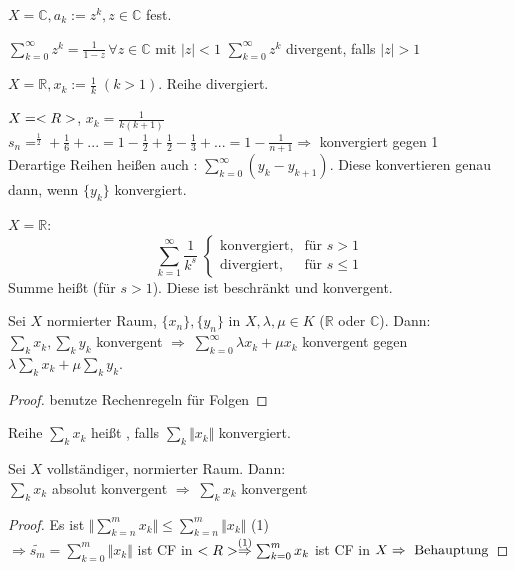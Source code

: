 \begin{example}
	 $X=\mathbb{C}, a_k:= z^k, z\in\mathbb{C}$ fest.
	
	$\sum_{k=0}^\infty z^k = \frac{1}{1-z}\,\forall z\in\mathbb{C}$ mit $|z|<1$
	$\sum_{k=0}^\infty z^k$ divergent, falls $|z|>1$
\end{example}
\begin{example}
	 $X=\mathbb{R}, x_k := \frac{1}{k}\;(k>1)$. Reihe divergiert.
\end{example}
\begin{example}
	$X=<R>$, $x_k=\frac{1}{k(k+1)}$ \\
	$s_n=^\frac{1}{2}+\frac{1}{6}+...=1-\frac{1}{2}+\frac{1}{2}-\frac{1}{3}+...=1-\frac{1}{n+1}\Rightarrow$ konvergiert gegen 1 \\
	Derartige Reihen heißen auch : $\sum_{k=0}^{\infty} (y_k-y_{k+1})$. Diese konvertieren genau dann, wenn $\{y_k\}$ konvergiert.
\end{example}
\begin{example}
	$X=\mathbb{R}$:\[ \sum_{k=1}^\infty \frac{1}{k^s}\;\begin{cases}
	\text{konvergiert},& \text{für }s > 1\\ \text{divergiert},& \text{für }s \le 1
	\end{cases} \]
	Summe heißt   (für $s > 1$). Diese ist beschränkt und konvergent.
\end{example}

\begin{proposition}
	Sei $X$ normierter Raum, $\{x_n\}, \{y_n\}$ in $X, \lambda,\mu\in K$ ($\mathbb{R}$ oder $\mathbb{C}$). Dann:\\
	$\sum_k x_k, \sum_k y_k$ konvergent $\Rightarrow\;\sum_{k=0}^\infty \lambda x_k + \mu x_k$ konvergent gegen $\lambda\sum_k x_k + \mu \sum_k y_k$.
\end{proposition}
\begin{proof}
	benutze Rechenregeln für Folgen
\end{proof}

\begin{*definition}
	Reihe $\sum_k x_k$ heißt , falls $\sum_k \Vert x_k\Vert$ konvergiert.
\end{*definition}

\begin{proposition}
	Sei $X$ vollständiger, normierter Raum. Dann:\\
	$\sum_k x_k$ absolut konvergent $\Rightarrow\;\sum_k x_k$ konvergent
\end{proposition}
\begin{proof}
	Es ist $\Vert\sum_{k=n}^m x_k\Vert\le \sum_{k=n}^m \Vert x_k\Vert$ (1) \\
	$\Rightarrow \tilde{s_m}=\sum_{k=0}^m \Vert x_k\Vert$ ist CF in $<R> \overset{(1)}{\Rightarrow} \sum_{k=0}^m x_k$ ist CF in $X\Rightarrow \text{ Behauptung}$
\end{proof}

